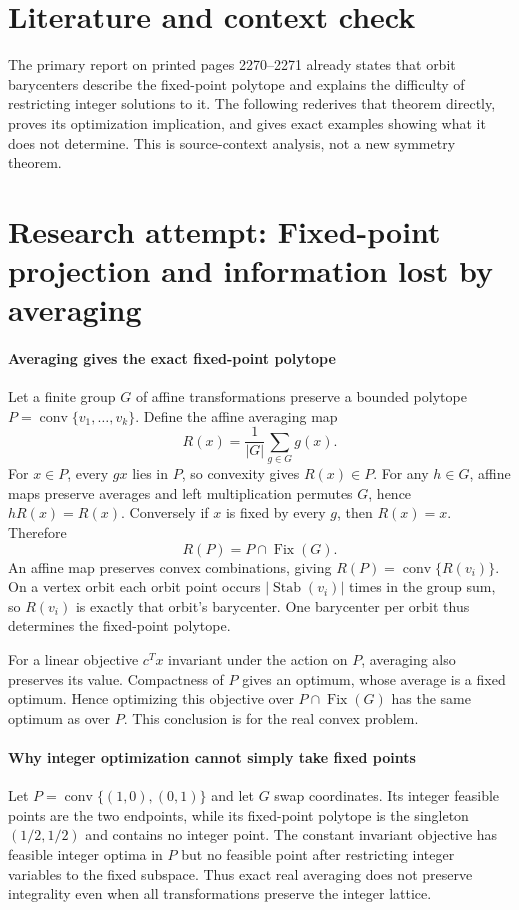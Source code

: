 \documentclass[11pt]{article}
\begin{document}
\section{Literature and context check}
The primary report on printed pages 2270--2271 already states that orbit barycenters describe the fixed-point polytope and explains the difficulty of restricting integer solutions to it. The following rederives that theorem directly, proves its optimization implication, and gives exact examples showing what it does not determine. This is source-context analysis, not a new symmetry theorem.
\section{Research attempt: Fixed-point projection and information lost by averaging}

\paragraph{Averaging gives the exact fixed-point polytope}
Let a finite group $G$ of affine transformations preserve a bounded polytope $P=\operatorname{conv}\{v_1,\ldots,v_k\}$. Define the affine averaging map
\[
 R(x)=\frac1{|G|}\sum_{g\in G}g(x).
\]
For $x\in P$, every $gx$ lies in $P$, so convexity gives $R(x)\in P$. For any $h\in G$, affine maps preserve averages and left multiplication permutes $G$, hence $hR(x)=R(x)$. Conversely if $x$ is fixed by every $g$, then $R(x)=x$. Therefore
\[
 R(P)=P\cap\operatorname{Fix}(G).
\]
An affine map preserves convex combinations, giving $R(P)=\operatorname{conv}\{R(v_i)\}$. On a vertex orbit each orbit point occurs $|\operatorname{Stab}(v_i)|$ times in the group sum, so $R(v_i)$ is exactly that orbit's barycenter. One barycenter per orbit thus determines the fixed-point polytope.

For a linear objective $c^Tx$ invariant under the action on $P$, averaging also preserves its value. Compactness of $P$ gives an optimum, whose average is a fixed optimum. Hence optimizing this objective over $P\cap\operatorname{Fix}(G)$ has the same optimum as over $P$. This conclusion is for the real convex problem.

\paragraph{Why integer optimization cannot simply take fixed points}
Let $P=\operatorname{conv}\{(1,0),(0,1)\}$ and let $G$ swap coordinates. Its integer feasible points are the two endpoints, while its fixed-point polytope is the singleton $(1/2,1/2)$ and contains no integer point. The constant invariant objective has feasible integer optima in $P$ but no feasible point after restricting integer variables to the fixed subspace. Thus exact real averaging does not preserve integrality even when all transformations preserve the integer lattice.
\end{document}

